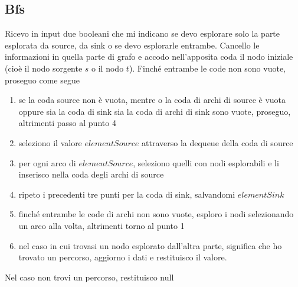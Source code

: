 \documentclass{article}
\begin{document}
\subsection{Bfs}
Ricevo in input due booleani che mi indicano se devo esplorare solo la parte esplorata da source, da sink o se devo esplorarle entrambe.
Cancello le informazioni in quella parte di grafo e accodo nell'apposita coda il nodo iniziale (cioè il nodo sorgente $s$ o il nodo $t$).
Finché entrambe le code non sono vuote, proseguo come segue
\begin{enumerate}
    \item se la coda source non è vuota, mentre o la coda di archi di source è vuota oppure sia la coda di sink sia la coda di archi di sink sono vuote, proseguo, altrimenti passo al punto 4
    \item seleziono il valore $elementSource$ attraverso la dequeue della coda di source
    \item per ogni arco di $elementSource$, seleziono quelli con nodi esplorabili e li inserisco nella coda degli archi di source
    \item ripeto i precedenti tre punti per la coda di sink, salvandomi $elementSink$
    \item finché entrambe le code di archi non sono vuote, esploro i nodi selezionando un arco alla volta, altrimenti torno al punto 1
    \item nel caso in cui trovasi un nodo esplorato dall'altra parte, significa che ho trovato un percorso, aggiorno i dati e restituisco il valore.
\end{enumerate}
Nel caso non trovi un percorso, restituisco null
\end{document}
